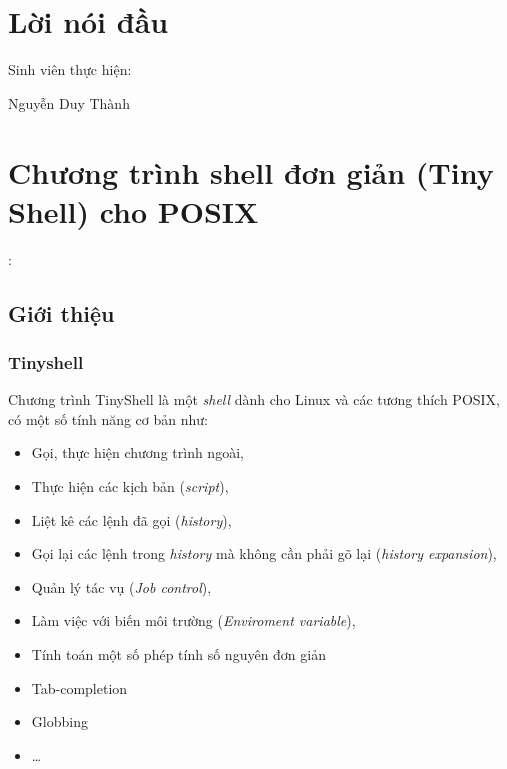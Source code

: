 \documentclass[a4paper,12pt]{report}
\begin{document}
    \newpage

    \tableofcontents
    \newpage
\chapter{Lời nói đầu}

    \begin{center}
        Sinh viên thực hiện:
    \end{center}

    \begin{flushright}
        \parbox[t]{4cm}{Nguyễn Duy Thành \\}
    \end{flushright}



\chapter{Chương trình shell đơn giản (Tiny Shell) cho POSIX}:
    \section{Giới thiệu}
        \subsection{Tinyshell}
        Chương trình TinyShell là một \textit{shell} dành cho Linux và các tương
        thích POSIX, có một số tính năng cơ bản như:
        \begin{itemize}
            \item Gọi, thực hiện chương trình ngoài,
            \item Thực hiện các kịch bản (\textit{script}),
            \item Liệt kê các lệnh đã gọi (\textit{history}),
            \item Gọi lại các lệnh trong \textit{history} mà không cần phải gõ lại
                (\textit{history expansion}),
            \item Quản lý tác vụ (\textit{Job control}),
            \item Làm việc với biến môi trường (\textit{Enviroment variable}),
            \item Tính toán một số phép tính số nguyên đơn giản
            \item Tab-completion
            \item Globbing
            \item \ldots{}
        \end{itemize}
\end{document}
